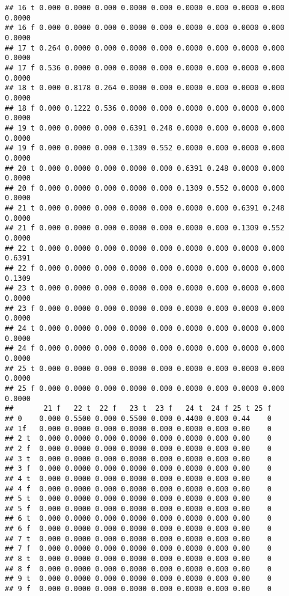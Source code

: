 \documentclass[]{article}
\begin{document}
\begin{verbatim}
## 16 t 0.000 0.0000 0.000 0.0000 0.000 0.0000 0.000 0.0000 0.000 0.0000
## 16 f 0.000 0.0000 0.000 0.0000 0.000 0.0000 0.000 0.0000 0.000 0.0000
## 17 t 0.264 0.0000 0.000 0.0000 0.000 0.0000 0.000 0.0000 0.000 0.0000
## 17 f 0.536 0.0000 0.000 0.0000 0.000 0.0000 0.000 0.0000 0.000 0.0000
## 18 t 0.000 0.8178 0.264 0.0000 0.000 0.0000 0.000 0.0000 0.000 0.0000
## 18 f 0.000 0.1222 0.536 0.0000 0.000 0.0000 0.000 0.0000 0.000 0.0000
## 19 t 0.000 0.0000 0.000 0.6391 0.248 0.0000 0.000 0.0000 0.000 0.0000
## 19 f 0.000 0.0000 0.000 0.1309 0.552 0.0000 0.000 0.0000 0.000 0.0000
## 20 t 0.000 0.0000 0.000 0.0000 0.000 0.6391 0.248 0.0000 0.000 0.0000
## 20 f 0.000 0.0000 0.000 0.0000 0.000 0.1309 0.552 0.0000 0.000 0.0000
## 21 t 0.000 0.0000 0.000 0.0000 0.000 0.0000 0.000 0.6391 0.248 0.0000
## 21 f 0.000 0.0000 0.000 0.0000 0.000 0.0000 0.000 0.1309 0.552 0.0000
## 22 t 0.000 0.0000 0.000 0.0000 0.000 0.0000 0.000 0.0000 0.000 0.6391
## 22 f 0.000 0.0000 0.000 0.0000 0.000 0.0000 0.000 0.0000 0.000 0.1309
## 23 t 0.000 0.0000 0.000 0.0000 0.000 0.0000 0.000 0.0000 0.000 0.0000
## 23 f 0.000 0.0000 0.000 0.0000 0.000 0.0000 0.000 0.0000 0.000 0.0000
## 24 t 0.000 0.0000 0.000 0.0000 0.000 0.0000 0.000 0.0000 0.000 0.0000
## 24 f 0.000 0.0000 0.000 0.0000 0.000 0.0000 0.000 0.0000 0.000 0.0000
## 25 t 0.000 0.0000 0.000 0.0000 0.000 0.0000 0.000 0.0000 0.000 0.0000
## 25 f 0.000 0.0000 0.000 0.0000 0.000 0.0000 0.000 0.0000 0.000 0.0000
##       21 f   22 t  22 f   23 t  23 f   24 t  24 f 25 t 25 f
## 0    0.000 0.5500 0.000 0.5500 0.000 0.4400 0.000 0.44    0
## 1f   0.000 0.0000 0.000 0.0000 0.000 0.0000 0.000 0.00    0
## 2 t  0.000 0.0000 0.000 0.0000 0.000 0.0000 0.000 0.00    0
## 2 f  0.000 0.0000 0.000 0.0000 0.000 0.0000 0.000 0.00    0
## 3 t  0.000 0.0000 0.000 0.0000 0.000 0.0000 0.000 0.00    0
## 3 f  0.000 0.0000 0.000 0.0000 0.000 0.0000 0.000 0.00    0
## 4 t  0.000 0.0000 0.000 0.0000 0.000 0.0000 0.000 0.00    0
## 4 f  0.000 0.0000 0.000 0.0000 0.000 0.0000 0.000 0.00    0
## 5 t  0.000 0.0000 0.000 0.0000 0.000 0.0000 0.000 0.00    0
## 5 f  0.000 0.0000 0.000 0.0000 0.000 0.0000 0.000 0.00    0
## 6 t  0.000 0.0000 0.000 0.0000 0.000 0.0000 0.000 0.00    0
## 6 f  0.000 0.0000 0.000 0.0000 0.000 0.0000 0.000 0.00    0
## 7 t  0.000 0.0000 0.000 0.0000 0.000 0.0000 0.000 0.00    0
## 7 f  0.000 0.0000 0.000 0.0000 0.000 0.0000 0.000 0.00    0
## 8 t  0.000 0.0000 0.000 0.0000 0.000 0.0000 0.000 0.00    0
## 8 f  0.000 0.0000 0.000 0.0000 0.000 0.0000 0.000 0.00    0
## 9 t  0.000 0.0000 0.000 0.0000 0.000 0.0000 0.000 0.00    0
## 9 f  0.000 0.0000 0.000 0.0000 0.000 0.0000 0.000 0.00    0

\end{verbatim}
\end{document}
